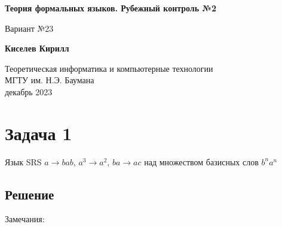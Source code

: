 \documentclass[a4paper, 14pt]{article}
\begin{document}
\begin{titlepage}
    \begin{center}
        \vspace*{1cm}
            
        \Huge
        \textbf{Теория формальных языков. Рубежный контроль №2}
		
        \vspace{0.5cm}
        \LARGE
        Вариант №23
            
        \vspace{1.5cm}
            
        \textbf{Киселев Кирилл}
            
        \vfill
            
        \vspace{0.8cm}
		
        \Large
        Теоретическая информатика и компьютерные технологии\\
        МГТУ им. Н.Э. Баумана\\
        декабрь 2023
            
    \end{center}
\end{titlepage}

\newpage

\tableofcontents 

\newpage

\section{Задача 1}

Язык SRS $a \rightarrow bab$, $a^3 \rightarrow a^2$, $ba \rightarrow ac$ над множеством базисных слов $b^n a^n$

\subsection{Решение}


Замечания:
\end{document}
